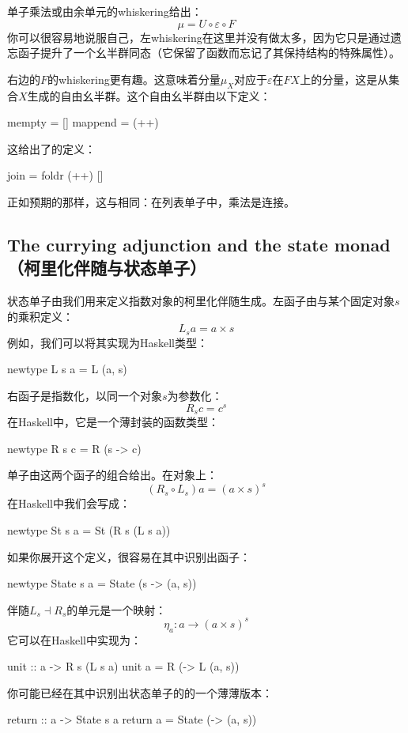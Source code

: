 \documentclass[DaoFP]{subfiles}
\begin{document}
    单子乘法或由余单元的whiskering给出：
    \[ \mu = U \circ \varepsilon \circ F \]
    你可以很容易地说服自己，左whiskering在这里并没有做太多，因为它只是通过遗忘函子提升了一个幺半群同态（它保留了函数而忘记了其保持结构的特殊属性）。

    右边的$F$的whiskering更有趣。这意味着分量$\mu_X$对应于$\varepsilon$在$F X$上的分量，这是从集合$X$生成的自由幺半群。这个自由幺半群由以下定义：
    \begin{haskell}
        mempty = []
        mappend = (++)
    \end{haskell}
    这给出了的定义：
    \begin{haskell}
        join = foldr (++) []
    \end{haskell}
    正如预期的那样，这与相同：在列表单子中，乘法是连接。

    \subsection{The currying adjunction and the state monad（柯里化伴随与状态单子）}

    状态单子由我们用来定义指数对象的柯里化伴随生成。左函子由与某个固定对象$s$的乘积定义：
    \[ L_s a = a \times s \]
    例如，我们可以将其实现为Haskell类型：
    \begin{haskell}
        newtype L s a = L (a, s)
    \end{haskell}
    右函子是指数化，以同一个对象$s$为参数化：
    \[ R_s c = c^s \]
    在Haskell中，它是一个薄封装的函数类型：
    \begin{haskell}
        newtype R s c = R (s -> c)
    \end{haskell}

    单子由这两个函子的组合给出。在对象上：
    \[(R_s \circ L_s) a = (a \times s)^s \]
    在Haskell中我们会写成：
    \begin{haskell}
        newtype St s a = St (R s (L s a))
    \end{haskell}
    如果你展开这个定义，很容易在其中识别出函子：
    \begin{haskell}
        newtype State s a = State (s -> (a, s))
    \end{haskell}

    伴随$L_s \dashv R_s$的单元是一个映射：
    \[ \eta_a \colon a \to (a \times s)^s \]
    它可以在Haskell中实现为：
    \begin{haskell}
        unit :: a -> R s (L s a)
        unit a = R (\s -> L (a, s))
    \end{haskell}
    你可能已经在其中识别出状态单子的的一个薄薄版本：
    \begin{haskell}
        return :: a -> State s a
        return a = State (\s -> (a, s))
    \end{haskell}
\end{document}
